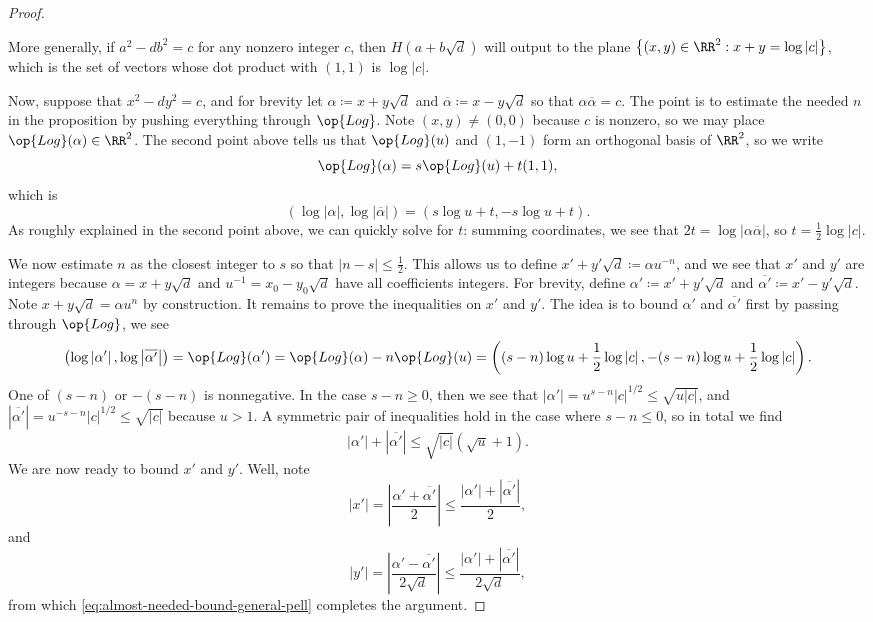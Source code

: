 \documentclass[../notes.tex]{subfiles}
\begin{document}
\begin{proof}
\begin{itemize}
		More generally, if $a^2-db^2=c$ for any nonzero integer $c$, then $H(a+b\sqrt d)$ will output to the plane $\left\{(x,y)\in\RR^2:x+y=\log\left|c\right|\right\}$, which is the set of vectors whose dot product with $(1,1)$ is $\log\left|c\right|$.
	\end{itemize}
	Now, suppose that $x^2-dy^2=c$, and for brevity let $\alpha\coloneqq x+y\sqrt d$ and $\overline\alpha\coloneqq x-y\sqrt d$ so that $\alpha\overline\alpha=c$. The point is to estimate the needed $n$ in the proposition by pushing everything through $\op{Log}$. Note $(x,y)\ne(0,0)$ because $c$ is nonzero, so we may place $\op{Log}(\alpha)\in\RR^2$. The second point above tells us that $\op{Log}(u)$ and $(1,-1)$ form an orthogonal basis of $\RR^2$, so we write
	\[\op{Log}(\alpha)=s\op{Log}(u)+t(1,1),\]
	which is
	\[\left(\log\left|\alpha\right|,\log\left|\overline\alpha\right|\right)=(s\log u+t,-s\log u+t).\]
	As roughly explained in the second point above, we can quickly solve for $t$: summing coordinates, we see that $2t=\log\left|\alpha\overline\alpha\right|$, so $t=\frac12\log\left|c\right|$.

	We now estimate $n$ as the closest integer to $s$ so that $\left|n-s\right|\le\frac12$. This allows us to define $x'+y'\sqrt d\coloneqq\alpha u^{-n}$, and we see that $x'$ and $y'$ are integers because $\alpha=x+y\sqrt d$ and $u^{-1}=x_0-y_0\sqrt d$ have all coefficients integers. For brevity, define $\alpha'\coloneqq x'+y'\sqrt d$ and $\overline{\alpha'}\coloneqq x'-y'\sqrt d$. Note $x+y\sqrt d=\alpha u^n$ by construction. It remains to prove the inequalities on $x'$ and $y'$. The idea is to bound $\alpha'$ and $\overline{\alpha'}$ first by passing through $\op{Log}$, we see
	\[\left(\log\left|\alpha'\right|,\log\left|\overline{\alpha'}\right|\right)=\op{Log}(\alpha')=\op{Log}(\alpha)-n\op{Log}(u)=\left((s-n)\log u+\frac12\log\left|c\right|,-(s-n)\log u+\frac12\log\left|c\right|\right).\]
	One of $(s-n)$ or $-(s-n)$ is nonnegative. In the case $s-n\ge0$, then we see that $\left|\alpha'\right|=u^{s-n}\left|c\right|^{1/2}\le\sqrt{u\left|c\right|}$, and $\left|\overline{\alpha'}\right|=u^{-s-n}\left|c\right|^{1/2}\le\sqrt{\left|c\right|}$ because $u>1$. A symmetric pair of inequalities hold in the case where $s-n\le0$, so in total we find
	\begin{equation}
		\left|\alpha'\right|+\left|\overline{\alpha'}\right|\le\sqrt{\left|c\right|}\left(\sqrt u+1\right). \label{eq:almost-needed-bound-general-pell}
	\end{equation}
	We are now ready to bound $x'$ and $y'$. Well, note
	\[\left|x'\right|=\left|\frac{\alpha'+\overline{\alpha'}}2\right|\le\frac{\left|\alpha'\right|+\left|\overline{\alpha'}\right|}2,\]
	and
	\[\left|y'\right|=\left|\frac{\alpha'-\overline{\alpha'}}{2\sqrt d}\right|\le\frac{\left|\alpha'\right|+\left|\overline{\alpha'}\right|}{2\sqrt d},\]
	from which \eqref{eq:almost-needed-bound-general-pell} completes the argument.
\end{proof}
\end{document}
